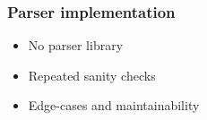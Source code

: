 \begin{frame}
    \frametitle{Parser implementation}
    \pause
    \begin{itemize}
        \item No parser library
        \pause
        \item Repeated sanity checks
        \pause
        \item Edge-cases and maintainability
    \end{itemize}
\end{frame}
